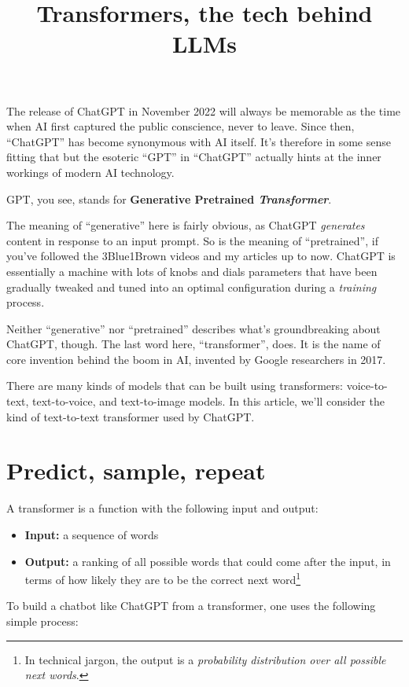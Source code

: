 \documentclass{article}
\title{Transformers, the tech behind LLMs}
\author{}
\date{}
\begin{document}
\maketitle

The release of ChatGPT in November 2022 will always be memorable as the time when AI first captured the public conscience, never to leave. Since then, ``ChatGPT'' has become synonymous with AI itself. It's therefore in some sense fitting that but the esoteric ``GPT'' in ``ChatGPT'' actually hints at the inner workings of modern AI technology.

GPT, you see, stands for \textbf{Generative Pretrained \textit{Transformer}}.

The meaning of ``generative'' here is fairly obvious, as ChatGPT \textit{generates} content in response to an input prompt. So is the meaning of ``pretrained'', if you've followed the 3Blue1Brown videos and my articles up to now. ChatGPT is essentially a machine with lots of knobs and dials parameters that have been gradually tweaked and tuned into an optimal configuration during a \textit{training} process.

Neither ``generative'' nor ``pretrained'' describes what's groundbreaking about ChatGPT, though. The last word here, ``transformer'', does. It is the name of core invention behind the boom in AI, invented by Google researchers in 2017.

There are many kinds of models that can be built using transformers: voice-to-text, text-to-voice, and text-to-image models. In this article, we'll consider the kind of text-to-text transformer used by ChatGPT.

\section*{Predict, sample, repeat}

A transformer is a function with the following input and output:

\begin{itemize}
	\item \textbf{Input:} a sequence of words
	\item \textbf{Output:} a ranking of all possible words that could come after the input, in terms of how likely they are to be the correct next word\footnote{In technical jargon, the output is a \textit{probability distribution over all possible next words}.}
\end{itemize}

To build a chatbot like ChatGPT from a transformer, one uses the following simple process:
\end{document}
